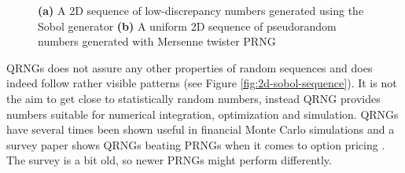 \begin{figure}
	\centering

  \caption{\textbf{(a)} A 2D sequence of low-discrepancy numbers
    generated using the Sobol generator \textbf{(b)} A uniform 2D
    sequence of pseudorandom numbers generated with Mersenne twister
    PRNG}
\label{fig:discrepancyplot}
\end{figure}

QRNGs does not assure any other properties of random sequences and
does indeed follow rather visible patterns (see Figure
\ref{fig:2d-sobol-sequence}). It is not the aim to get close to
statistically random numbers, instead QRNG provides numbers suitable
for numerical integration, optimization and simulation. QRNGs have
several times been shown useful in financial Monte Carlo simulations
\cite{chaudhary2005american, couffignals2010quasi,
  dfine2009americanbasket}  and a survey paper shows QRNGs beating PRNGs
when it comes to option pricing \cite{acworth1998comparison}. The
survey is a bit old, so newer PRNGs might perform differently.

